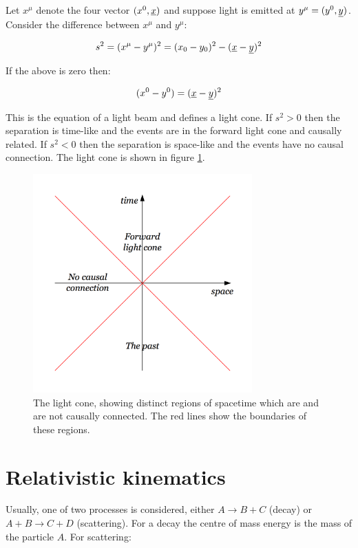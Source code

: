 Let $x^{\mu}$ denote the four vector $(x^0,\underline{x})$ and suppose light is emitted at $y^{\mu} = (y^0,\underline{y})$.  Consider the difference between $x^{\mu}$ and $y^{\mu}$:

\[
  s^2 = (x^{\mu} - y^{\mu})^2 = (x_0 - y_0)^2 - (\underline{x} - \underline{y})^2
\]

If the above is zero then:

\[
  (x^0 - y^0) = (\underline{x} - \underline{y})^2
\]

This is the equation of a light beam and defines a light cone.  If $s^2>0$ then the separation is time-like and the events are in the forward light cone and causally related.  If $s^2<0$ then the separation is space-like and the events have no causal connection.  The light cone is shown in figure \ref{fig:ch5_lightcone}.

\begin{figure}[!htb]
  \begin{center}
    \includegraphics[width=0.75\textwidth]{images/chapter_5/lightcone.pdf}
    \caption[The light cone]{The light cone, showing distinct regions of spacetime which are and are not causally connected.  The red lines show the boundaries of these regions.}
    \label{fig:ch5_lightcone}
  \end{center}
\end{figure}

\section{Relativistic kinematics}

Usually, one of two processes is considered, either $A \to B + C$ (decay) or $A + B \to C + D$ (scattering).  For a decay the centre of mass energy is the mass of the particle $A$.  For scattering:

